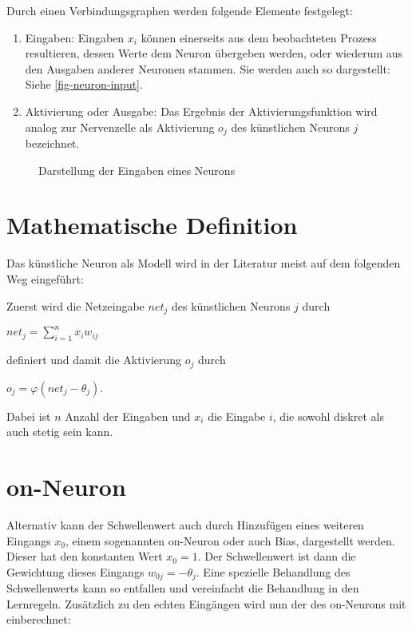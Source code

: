 Durch einen Verbindungsgraphen werden folgende Elemente festgelegt:
\begin{enumerate}
\item Eingaben: Eingaben $x_{i}$ können einerseits aus dem beobachteten Prozess resultieren, dessen Werte dem Neuron übergeben werden, oder wiederum aus den Ausgaben anderer Neuronen stammen. Sie werden auch so dargestellt: Siehe \vref {fig-neuron-input}.
\item Aktivierung oder Ausgabe: Das Ergebnis der Aktivierungsfunktion wird analog zur Nervenzelle als Aktivierung $o_{j}$ des künstlichen Neurons $j$ bezeichnet.
\end{enumerate}

\begin{figure}
  \centering
  \caption[Eingabe Neuron]{Darstellung der Eingaben eines Neurons}
  \label{fig-neuron-input}
\end{figure}

\section{Mathematische Definition}
Das künstliche Neuron als Modell wird in der Literatur meist auf dem folgenden Weg eingeführt:
\begin{Definition}[Definition]
  Zuerst wird die Netzeingabe $net_{j}$ des künstlichen Neurons $j$ durch

    \centerline {$net_j = \sum_{i = 1}^n x_iw_{ij}$}

definiert und damit die Aktivierung $o_j$ durch

	\centerline {$o_j = \varphi (net_j - \theta_j)$.}

Dabei ist $n$ Anzahl der Eingaben und $x_i$ die Eingabe $i$, die sowohl diskret als auch stetig sein kann. 
\end{Definition}

\section{on-Neuron}
Alternativ kann der Schwellenwert auch durch Hinzufügen eines weiteren Eingangs $x_0$, einem sogenannten on-Neuron oder auch Bias, dargestellt werden. Dieser hat den konstanten Wert $x_0 = 1$. Der Schwellenwert ist dann die Gewichtung dieses Eingangs $w_{0j} = - \theta_j$. Eine spezielle Behandlung des Schwellenwerts kann so entfallen und vereinfacht die Behandlung in den Lernregeln. Zusätzlich zu den echten Eingängen wird nun der des on-Neurons mit einberechnet:

